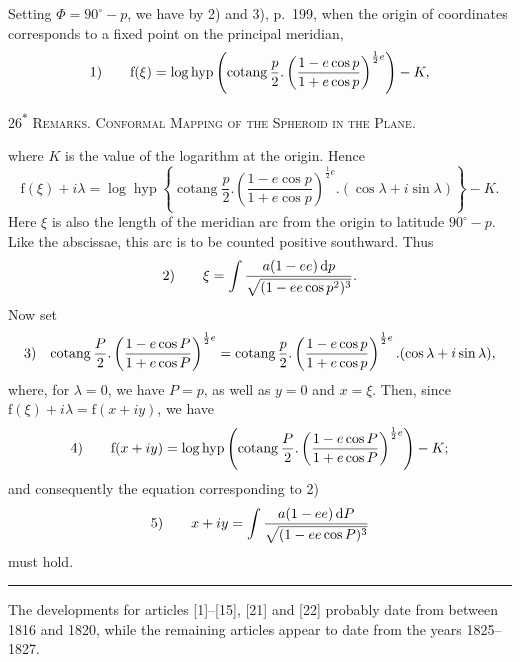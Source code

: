Setting $\Phi=90^\circ-p$, we have by 2) and 3), p.~199, when the origin of coordinates corresponds to a fixed point on the principal meridian,
\[
\begin{array}{r@{\qquad}l}
1)&\displaystyle\mathrm f(\xi)=\log\operatorname{hyp}
\left(\operatorname{cotang}\frac p2.\left(\frac{1-e\cos p}{1+e\cos p}\right)^{\frac12e}\right)-K,
\end{array}
\]
\par\endgroup
\vfill\noindent\hfill26\textsuperscript{$\ast$}\hspace*{2cm}
\clearpage
{}\hfill\textsc{Remarks. Conformal Mapping of the Spheroid in the Plane.}\par\medskip
\begingroup\footnotesize
where $K$ is the value of the logarithm at the origin. Hence
\[
\mathrm f(\xi)+i\lambda=\log\operatorname{hyp}\left\{\operatorname{cotang}\frac p2.\left(\frac{1-e\cos p}{1+e\cos p}\right)^{\frac12e}.(\cos\lambda+i\sin\lambda)\right\}-K.
\]
Here $\xi$ is also the length of the meridian arc from the origin to latitude $90^\circ-p$. Like the abscissae, this arc is to be counted positive southward. Thus
\[
\begin{array}{r@{\qquad}l}
2)&\displaystyle\xi=\int\frac{a(1-ee)\,\mathrm dp}{\sqrt{(1-ee\cos p^2)^3}}.
\end{array}
\]
Now set
\[
\begin{array}{r@{\quad}l}
3)&\displaystyle\operatorname{cotang}\frac P2.\left(\frac{1-e\cos P}{1+e\cos P}\right)^{\frac12e}
=\operatorname{cotang}\frac p2.\left(\frac{1-e\cos p}{1+e\cos p}\right)^{\frac12e}.(\cos\lambda+i\sin\lambda),
\end{array}
\]
where, for $\lambda=0$, we have $P=p$, as well as $y=0$ and $x=\xi$. Then, since $\mathrm f(\xi)+i\lambda=\mathrm f(x+iy)$, we have
\[
\begin{array}{r@{\qquad}l}
4)&\displaystyle\mathrm f(x+iy)=\log\operatorname{hyp}\left(\operatorname{cotang}\frac P2.\left(\frac{1-e\cos P}{1+e\cos P}\right)^{\frac12e}\right)-K;
\end{array}
\]
and consequently the equation corresponding to 2)
\[
\begin{array}{r@{\qquad}l}
5)&\displaystyle x+iy=\int\frac{a(1-ee)\,\mathrm dP}{\sqrt{(1-ee\cos P)^3}}
\end{array}
\]
must hold.
\begin{center}\rule{4cm}{.4pt}\end{center}
\bigskip
The developments for articles [1]--[15], [21] and [22] probably date from between 1816 and 1820, while the remaining articles appear to date from the years 1825--1827.
